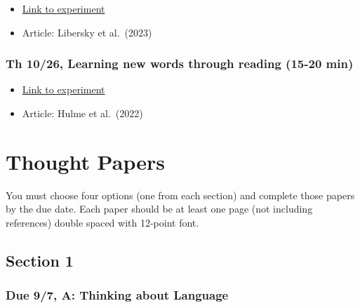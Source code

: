 \documentclass[
  letterpaper,
  DIV=11,
  numbers=noendperiod]{scrreprt}
\providecommand{\tightlist}{%
  \setlength{\itemsep}{0pt}\setlength{\parskip}{0pt}}\usepackage{longtable,booktabs,array}
\begin{document}
\begin{itemize}
\tightlist
\item
  \href{https://research.sc/participant/login/dynamic/6824FDBF-4409-4B02-AE9E-10BA428B1D61}{Link
  to experiment}
\item
  Article: Libersky et al.~(2023)
\end{itemize}

\hypertarget{th-1026-learning-new-words-through-reading-15-20-min}{%
\subsection*{Th 10/26, Learning new words through reading (15-20
min)}\label{th-1026-learning-new-words-through-reading-15-20-min}}

\begin{itemize}
\tightlist
\item
  \href{https://research.sc/participant/login/dynamic/B3E7A61D-6F92-4B3A-B80A-8D8513D01C6B}{Link
  to experiment}
\item
  Article: Hulme et al.~(2022)
\end{itemize}

\hypertarget{thought-papers}{%
\chapter*{Thought Papers}\label{thought-papers}}


You must choose four options (one from each section) and complete those
papers by the due date. Each paper should be at least one page (not
including references) double spaced with 12-point font.

\hypertarget{section-1}{%
\section*{\texorpdfstring{{Section 1}}{Section 1}}\label{section-1}}


\hypertarget{due-97-a-thinking-about-language}{%
\subsection*{Due 9/7, A: Thinking about
Language}\label{due-97-a-thinking-about-language}}
\end{document}
